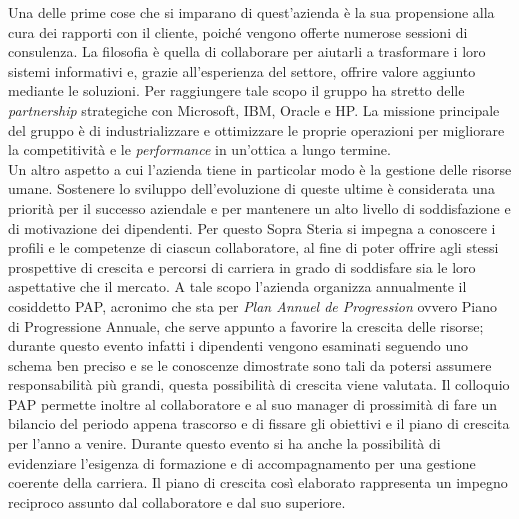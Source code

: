 	Una delle prime cose che si imparano di quest'azienda è la sua propensione alla cura dei rapporti con il cliente, poiché vengono offerte numerose sessioni	di consulenza. La filosofia è quella di collaborare per aiutarli a trasformare i loro sistemi informativi e, grazie all'esperienza del settore, offrire valore aggiunto mediante le soluzioni. Per raggiungere tale scopo il gruppo ha stretto delle \textit{partnership} strategiche con Microsoft, IBM, Oracle e HP. La missione principale del gruppo è di industrializzare e ottimizzare le proprie operazioni per migliorare la competitività e le  \textit{performance} in un'ottica a lungo termine.\\
	
	Un altro aspetto a cui l'azienda tiene in particolar modo è la gestione delle risorse umane. Sostenere lo sviluppo dell'evoluzione di queste ultime è considerata una priorità per il successo aziendale e per mantenere un alto livello di soddisfazione e di motivazione dei dipendenti. Per questo Sopra Steria si impegna a conoscere i profili e le competenze di ciascun collaboratore, al fine di poter offrire agli stessi prospettive di crescita e percorsi di carriera in grado di soddisfare sia le loro aspettative che il mercato. A tale scopo l'azienda organizza annualmente il cosiddetto PAP, acronimo che sta per \textit{Plan Annuel de Progression} ovvero Piano di Progressione Annuale, che serve appunto a favorire la crescita delle risorse; durante questo evento infatti i dipendenti vengono esaminati seguendo uno schema ben preciso e se le conoscenze dimostrate sono tali da potersi assumere responsabilità più grandi, questa possibilità di crescita viene valutata. Il colloquio PAP permette inoltre al collaboratore e al suo manager di prossimità di fare un bilancio del periodo appena trascorso e di fissare gli obiettivi e il piano di crescita per l'anno a venire. Durante questo evento si ha anche la possibilità di evidenziare l'esigenza di formazione e di accompagnamento per una gestione coerente della carriera. Il piano di crescita così elaborato rappresenta un impegno reciproco assunto dal collaboratore e dal suo superiore.%
	
	

